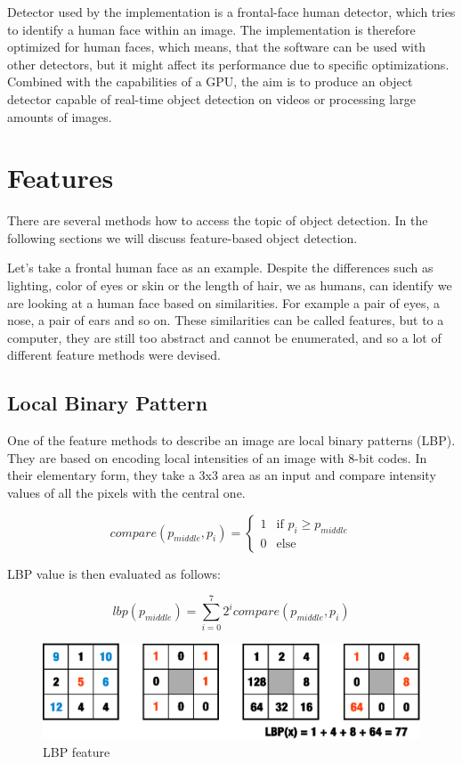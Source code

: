 Detector used by the implementation is a frontal-face human detector, which tries to identify a human face within an image. The implementation is therefore optimized for human faces, which means, that the software can be used with other detectors, but it might affect its performance due to specific optimizations. Combined with the capabilities of a GPU, the aim is to produce an object detector capable of real-time object detection on videos or processing large amounts of images.

\section{Features}

There are several methods how to access the topic of object detection. In the following sections we will discuss feature-based object detection.

Let's take a frontal human face as an example. Despite the differences such as lighting, color of eyes or skin or the length of hair, we as humans, can identify we are looking at a human face based on similarities. For example a pair of eyes, a nose, a pair of ears and so on. These similarities can be called features, but to a computer, they are still too abstract and cannot be enumerated, and so a lot of different feature methods were devised.

\subsection{Local Binary Pattern}

One of the feature methods to describe an image are local binary patterns (LBP). They are based on encoding local intensities of an image with 8-bit codes. In their elementary form, they take a 3x3 area as an input and compare intensity values of all the pixels with the central one.

\[
 compare(p_{middle},p_{i}) =
  \begin{cases}
   1 & \text{if } p_{i} \geq p_{middle} \\
   0 & \text{else}
  \end{cases}
\]

LBP value is then evaluated as follows:

\begin{equation}
lbp(p_{middle})=\sum_{i=0}^{7} 2^{i}
compare(p_{middle},p_{i})
\end{equation}


\begin{center}
\begin{figure}[h]
	\centering\includegraphics[width=12cm]{fig/lbp.eps}
	\caption{LBP feature}
\end{figure}
\end{center}

